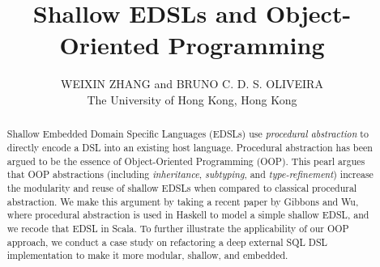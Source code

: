\documentclass{jfp1}
\begin{document}
\title{Shallow EDSLs and Object-Oriented Programming}

\author[W. Zhang and B. Oliveira]
        {WEIXIN ZHANG and BRUNO C. D. S. OLIVEIRA\\
         The University of Hong Kong, Hong Kong}

\maketitle[f]

\begin{abstract}
Shallow Embedded Domain Specific Languages (EDSLs) use
\emph{procedural abstraction} to directly encode a DSL into an existing host language. Procedural abstraction has
been argued to be the essence of Object-Oriented Programming (OOP).
This pearl argues that OOP abstractions
(including \emph{inheritance}, \emph{subtyping}, and
\emph{type-refinement})
increase the modularity and reuse of shallow
EDSLs when compared to classical procedural abstraction. We make this
argument by taking a recent paper by Gibbons and Wu, where procedural
abstraction is used in Haskell to model a simple shallow EDSL, and we recode
that EDSL in Scala. 
To further illustrate the applicability of our OOP approach, we conduct
a case study on refactoring a deep external SQL DSL implementation to make it
more modular, shallow, and embedded.
\end{abstract}













\end{document}
